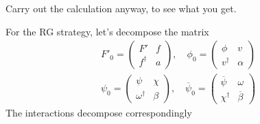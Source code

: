 \begin{idea}
Carry out the calculation anyway, to see what you get.	
\end{idea}

For the RG strategy, let's decompose the matrix
\begin{align*}
	F'_0 = \begin{pmatrix} F' & f \\ f^\dagger & a \end{pmatrix},\quad \phi_0 = \begin{pmatrix} \phi & v \\ v^\dagger & \alpha \end{pmatrix} \\
	\psi_0 = \begin{pmatrix} \psi & \chi \\ \omega^\dagger & \beta \end{pmatrix},\quad \overline{\psi}_0 = \begin{pmatrix} \overline{\psi} & \omega \\ \chi^\dagger & \overline{\beta} \end{pmatrix}
\end{align*}
The interactions decompose correspondingly
